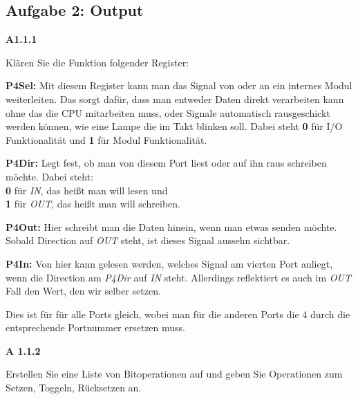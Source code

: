 \subsection*{Aufgabe 2: Output}
\begin{description}

\item{\bfseries A1.1.1}

Klären Sie die Funktion folgender Register:

\begin{description}

\item{\bfseries P4Sel:} Mit diesem Register kann man das Signal von oder an ein internes Modul weiterleiten. Das sorgt dafür, dass man entweder Daten direkt verarbeiten kann ohne das die CPU mitarbeiten muss, oder Signale automatisch rausgeschickt werden können, wie eine Lampe die im Takt blinken soll. Dabei steht \textbf{0} für I/O Funktionalität und \textbf{1} für Modul Funktionalität.

\item{\bfseries P4Dir:}  Legt fest, ob man von diesem Port liest oder auf ihn raus schreiben möchte. Dabei steht:\\
\textbf{0} für \emph{IN}, das heißt man will lesen und\\
\textbf{1} für \emph{OUT}, das heißt man will schreiben. 

\item{\bfseries P4Out:} Hier schreibt man die Daten hinein, wenn man etwas senden möchte. Sobald Direction auf \emph{OUT} steht, ist dieses Signal aussehn sichtbar.


\item{\bfseries P4In:} Von hier kann gelesen werden, welches Signal am vierten Port anliegt, wenn die Direction am \emph{P4Dir} auf \emph{IN} steht. Allerdings reflektiert es auch im \emph{OUT} Fall den Wert, den wir selber setzen.

\end{description}

Dies ist für für alle Ports gleich, wobei man für die anderen Ports die 4 durch die entsprechende Portnummer ersetzen muss.

\item{\bfseries A 1.1.2}

Erstellen Sie eine Liste von Bitoperationen auf und geben Sie Operationen zum Setzen, Toggeln, Rücksetzen an.

\begin{tabular}{c|c|c}


\end{tabular}
\end{description}
